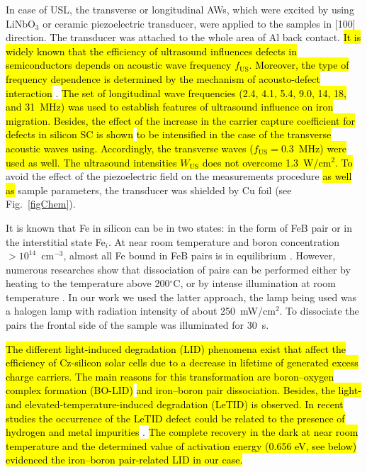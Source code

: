 \documentclass[sn-mathphys]{sn-jnl}%
\theoremstyle{thmstyleone}%
\theoremstyle{thmstyletwo}%
\theoremstyle{thmstylethree}%
\begin{document}
In case of USL, the transverse or longitudinal AWs, which were excited by using LiNbO$_3$ or ceramic piezoelectric transducer,
were applied to the samples in [100] direction.
The transducer was attached to the whole area of Al back contact.
\hl{It is widely known that the efficiency of ultrasound influences defects
in semiconductors depends on acoustic wave frequency $f_\mathrm{US}$.
Moreover, the type of frequency dependence is determined by the mechanism of acousto-defect
interaction} \cite{Brailsford,Pavlovich,PeleshchakUJF2016}.
\hl{ The set of longitudinal wave frequencies (2.4, 4.1, 5.4, 9.0, 14, 18, and 31~MHz)
was used  to establish features of
ultrasound influence on iron migration.
Besides,  the effect of the increase in the carrier capture coefficient for defects in silicon SC
is shown} \cite{Olikh2018SM} \hl{ to be intensified in the case of the transverse acoustic waves using.
Accordingly, the transverse waves ($f_\mathrm{US}=0.3$~MHz) were used as well.
The ultrasound intensities $W_\mathrm{US}$  does not overcome 1.3~W/cm$^2$.
To} avoid the effect of the piezoelectric field on the measurements procedure \hl{as well as} sample parameters,
the transducer was shielded by Cu foil (see Fig.~\ref{figChem}).

It is known that Fe in silicon can be in two states:
in the form of FeB pair or in the interstitial state Fe$_i$.
At near room temperature and boron concentration $>10^{14}$~cm$^{-3}$,
almost all Fe bound in FeB pairs is in equilibrium \cite{FeB:kinetic,FeBAssJAP2014,FeBAssSST2011,FeBJAP2005}.
However, numerous researches show that dissociation of pairs can be performed either by heating to the temperature above 200$^\circ$C,
or by intense illumination at room temperature \cite{FeBAssJAP2014,FeBJAP2005}.
In our work we used the latter approach, the lamp being used was a halogen lamp with radiation intensity of about 250~mW/cm$^2$.
To dissociate the pairs the frontal side of the sample was illuminated for 30~s.

\hl{The different light-induced degradation (LID) phenomena exist that affect the efficiency
of Cz-silicon solar cells due to a decrease in lifetime of generated excess charge carriers.
The main reasons for this transformation are boron--oxygen complex formation (BO-LID)} \cite{LIDRev}
\hl{ and
iron--boron pair dissociation.
Besides, the light- and elevated-temperature-induced degradation (LeTID) is observed.
In recent studies the occurrence of the LeTID defect could be related
to the presence of hydrogen and metal impurities }\cite{LeTID_H,LeTID_Me,LeTID_Me2}.
\hl{ The complete  recovery in the dark at near room temperature and the determined value
of activation energy (0.656 eV, see below) evidenced the iron--boron pair-related LID in our case.}
\end{document}

